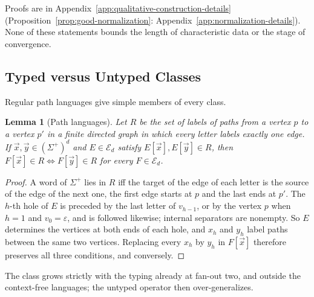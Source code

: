 \documentclass[11pt]{article}
\numberwithin{equation}{section}
\theoremstyle{plain}
\newtheorem{lemma}[theorem]{Lemma}
\theoremstyle{definition}
\theoremstyle{remark}
\newcommand{\tuple}[1]{\vec{#1}}
\newcommand{\eps}{\varepsilon}
\theoremstyle{plain}
\begin{document}
Proofs are in Appendix~\ref{app:qualitative-construction-details}
(Proposition~\ref{prop:good-normalization}: Appendix~\ref{app:normalization-details}).
None of these statements bounds the length of characteristic data or the
stage of convergence.

\subsection{Typed versus Untyped Classes}
\label{subsec:typed-separation}

Regular path languages give simple members of every class.

\begin{lemma}[Path languages]\label{lem:app-lf-path}
Let $R$ be the set of labels of paths from a vertex $p$ to a vertex $p'$ in a
finite directed graph in which every letter labels exactly one edge.  If
$\tuple x,\tuple y\in(\Sigma^+)^d$ and $E\in\mathcal E_d$ satisfy
$E[\tuple x],E[\tuple y]\in R$, then $F[\tuple x]\in R\iff F[\tuple y]\in R$ for
every $F\in\mathcal E_d$.
\end{lemma}

\begin{proof}
A word of $\Sigma^+$ lies in $R$ iff the target of the edge of each letter is the
source of the edge of the next one, the first edge starts at $p$ and the last
ends at $p'$.  The $h$-th hole of $E$ is preceded by the last letter of
$v_{h-1}$, or by the vertex $p$ when $h=1$ and $v_0=\eps$, and is followed
likewise; internal separators are nonempty.  So $E$ determines the vertices at
both ends of each hole, and $x_h$ and $y_h$ label paths between the same two
vertices.  Replacing every $x_h$ by $y_h$ in $F[\tuple x]$ therefore preserves
all three conditions, and conversely.
\end{proof}

The class grows strictly with the typing already at fan-out two, and outside the
context-free languages; the untyped operator then over-generalizes.
\end{document}
